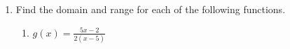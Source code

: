 \documentclass[11pt]{article}
\begin{document}
\begin{enumerate}
{{\[\begin{aligned} & \left[\begin{array}{cc|c} -5 & 12 & -30 \\ 1 & -3 & 6 \end{array}\right] \\ \xrightarrow{R_1 \leftrightarrow R_2} & \left[\begin{array}{cc|c} 1 & -3 & 6 \\ -5 & 12 & -30 \end{array}\right] \\ \xrightarrow{R_2 + 5R_1 \to R_2} & \left[\begin{array}{cc|c} 1 & -3 & 6 \\ 0 & -3 & 0 \end{array}\right] \\ \xrightarrow{\frac{R_2}{-3} \to R_2} & \left[\begin{array}{cc|c} 1 & -3 & 6 \\ 0 & 1 & 0 \end{array}\right] \\ \xrightarrow{R_1 + 3R_2 \to R_1} & \left[\begin{array}{cc|c} 1 & 0 & 6 \\ 0 & 1 & 0 \end{array}\right] \end{aligned}\]

\(\boxed{ (6, 0) }\)

}
}

\newpage

% 

\item %
\providecommand{\stxKnowl}{}\renewcommand{\stxKnowl}[1]{#1}
\providecommand{\stxOuttro}{}\renewcommand{\stxOuttro}[1]{#1}
\providecommand{\stxTitle}{}\renewcommand{\stxTitle}[1]{#1}
\renewcommand{\stxOuttro}[1]{}
\stxKnowl{
Find the domain and range for each of the following functions.

\begin{enumerate}
\item
\stxKnowl{
\(g(x) = \displaystyle \frac{5x - 2}{2(x - 5)}\)

\stxOuttro{
Solution

\[x - 5 \neq 0 \implies x \neq 5\]

domain: \(\boxed{ x \neq 5 }\)

\[y = \frac{5}{2} \implies y \neq \frac{5}{2}\]

}}
\end{enumerate}}
\end{enumerate}
\end{document}
